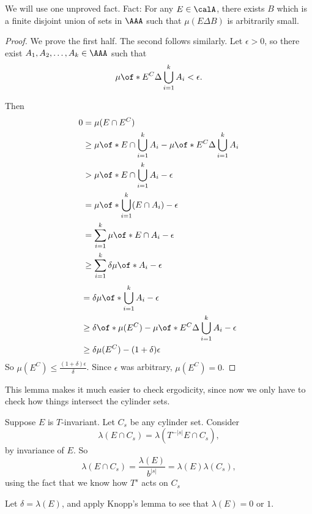 \documentclass{article}
\begin{document}
We will use one unproved fact. Fact: For any 
$E\in\calA$, there exists $B$ which is a finite disjoint union
of sets in $\AAA$ such that 
$\mu(E\Delta B)$ is arbitrarily small.

\begin{proof}
    We prove the first half. The second follows similarly.
    Let $\epsilon > 0$, so there exist $A_1,A_2,\ldots,A_k\in\AAA$
    such that 
    \[\mu\of*{E^C \Delta \bigcup_{i=1}^k A_i} < \epsilon.\]

    Then 
    \begin{align*}
        0 &= \mu(E\cap E^C) \\
        &\ge
        \mu\of*{E\cap \bigcup_{i=1}^kA_i}
        - \mu\of*{E^C \Delta \bigcup_{i=1}^k A_i}
        \\
        & > 
        \mu\of*{E\cap \bigcup_{i=1}^kA_i} - \epsilon
        \\
        &=
        \mu\of*{\bigcup_{i=1}^k(E\cap A_i)} - \epsilon
        \\
        &=
        \sum_{i=1}^k\mu\of*{E\cap A_i} - \epsilon
        \\
        &\ge 
        \sum_{i=1}^k\delta\mu\of*{A_i} - \epsilon
        \\
    \end{align*}
    \begin{align*}
        &=
        \delta \mu\of*{\bigcup_{i=1}^k A_i} - \epsilon
        \\
        &\ge 
        \delta \of*{\mu(E^C) - \mu\of*{E^C\Delta \bigcup_{i=1}^k A_i}}
        - \epsilon
        \\
        &\ge 
        \delta \mu(E^C) 
        - (1+\delta)\epsilon
        \\
    \end{align*}
    So $\mu(E^C)\le \frac{(1+\delta)\epsilon}{\delta}$.
    Since $\epsilon$ was arbitrary, $\mu(E^C)=0$.
\end{proof}

This lemma makes it much easier to check ergodicity, since 
now we only have to check how things intersect the cylinder 
sets.

\begin{example}[Base-$b$]
    Suppose $E$ is $T$-invariant.
    Let $C_s$ be any cylinder set. Consider 
    \[\lambda(E\cap C_s)= \lambda (T^{-|s|}E\cap C_s),\]
    by invariance of $E$.
    So 
    \[\lambda(E\cap C_s) = \frac{\lambda(E)}{b^{|s|}} 
    = \lambda(E)\lambda(C_s), \]
    using the fact that we know how $T^s$ acts on $C_s$

    Let $\delta = \lambda(E)$, and apply Knopp's lemma to 
    see that $\lambda(E) = 0$ or $1$.
\end{example}
\end{document}
